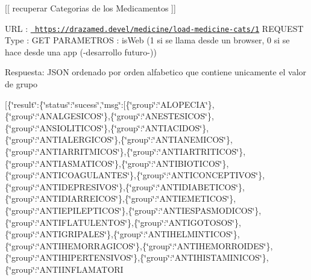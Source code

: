 \mbox{[}\mbox{[} recuperar Categorias de los Medicamentos \mbox{]}\mbox{]}

U\+RL \+: \href{https://drazamed.devel/medicine/load-medicine-cats/1}{\texttt{ https\+://drazamed.\+devel/medicine/load-\/medicine-\/cats/1}} R\+E\+Q\+U\+E\+ST Type \+: G\+ET P\+A\+R\+A\+M\+E\+T\+R\+OS \+: is\+Web (1 si se llama desde un browser, 0 si se hace desde una app (-\/desarrollo futuro-\/))

Respuesta\+: J\+S\+ON ordenado por orden alfabetico que contiene unicamente el valor de grupo

\mbox{[}\{\char`\"{}result\char`\"{}\+:\{\char`\"{}status\char`\"{}\+:\char`\"{}sucess\char`\"{},\char`\"{}msg\char`\"{}\+:\mbox{[}\{\char`\"{}group\char`\"{}\+:\char`\"{}\+A\+L\+O\+P\+E\+C\+I\+A\char`\"{}\},\{\char`\"{}group\char`\"{}\+:\char`\"{}\+A\+N\+A\+L\+G\+E\+S\+I\+C\+O\+S\char`\"{}\},\{\char`\"{}group\char`\"{}\+:\char`\"{}\+A\+N\+E\+S\+T\+E\+S\+I\+C\+O\+S\char`\"{}\},\{\char`\"{}group\char`\"{}\+:\char`\"{}\+A\+N\+S\+I\+O\+L\+I\+T\+I\+C\+O\+S\char`\"{}\},\{\char`\"{}group\char`\"{}\+:\char`\"{}\+A\+N\+T\+I\+A\+C\+I\+D\+O\+S\char`\"{}\},\{\char`\"{}group\char`\"{}\+:\char`\"{}\+A\+N\+T\+I\+A\+L\+E\+R\+G\+I\+C\+O\+S\char`\"{}\},\{\char`\"{}group\char`\"{}\+:\char`\"{}\+A\+N\+T\+I\+A\+N\+E\+M\+I\+C\+O\+S\char`\"{}\},\{\char`\"{}group\char`\"{}\+:\char`\"{}\+A\+N\+T\+I\+A\+R\+R\+I\+T\+M\+I\+C\+O\+S\char`\"{}\},\{\char`\"{}group\char`\"{}\+:\char`\"{}\+A\+N\+T\+I\+A\+R\+T\+R\+I\+T\+I\+C\+O\+S\char`\"{}\},\{\char`\"{}group\char`\"{}\+:\char`\"{}\+A\+N\+T\+I\+A\+S\+M\+A\+T\+I\+C\+O\+S\char`\"{}\},\{\char`\"{}group\char`\"{}\+:\char`\"{}\+A\+N\+T\+I\+B\+I\+O\+T\+I\+C\+O\+S\char`\"{}\},\{\char`\"{}group\char`\"{}\+:\char`\"{}\+A\+N\+T\+I\+C\+O\+A\+G\+U\+L\+A\+N\+T\+E\+S\char`\"{}\},\{\char`\"{}group\char`\"{}\+:\char`\"{}\+A\+N\+T\+I\+C\+O\+N\+C\+E\+P\+T\+I\+V\+O\+S\char`\"{}\},\{\char`\"{}group\char`\"{}\+:\char`\"{}\+A\+N\+T\+I\+D\+E\+P\+R\+E\+S\+I\+V\+O\+S\char`\"{}\},\{\char`\"{}group\char`\"{}\+:\char`\"{}\+A\+N\+T\+I\+D\+I\+A\+B\+E\+T\+I\+C\+O\+S\char`\"{}\},\{\char`\"{}group\char`\"{}\+:\char`\"{}\+A\+N\+T\+I\+D\+I\+A\+R\+R\+E\+I\+C\+O\+S\char`\"{}\},\{\char`\"{}group\char`\"{}\+:\char`\"{}\+A\+N\+T\+I\+E\+M\+E\+T\+I\+C\+O\+S\char`\"{}\},\{\char`\"{}group\char`\"{}\+:\char`\"{}\+A\+N\+T\+I\+E\+P\+I\+L\+E\+P\+T\+I\+C\+O\+S\char`\"{}\},\{\char`\"{}group\char`\"{}\+:\char`\"{}\+A\+N\+T\+I\+E\+S\+P\+A\+S\+M\+O\+D\+I\+C\+O\+S\char`\"{}\},\{\char`\"{}group\char`\"{}\+:\char`\"{}\+A\+N\+T\+I\+F\+L\+A\+T\+U\+L\+E\+N\+T\+O\+S\char`\"{}\},\{\char`\"{}group\char`\"{}\+:\char`\"{}\+A\+N\+T\+I\+G\+O\+T\+O\+S\+O\+S\char`\"{}\},\{\char`\"{}group\char`\"{}\+:\char`\"{}\+A\+N\+T\+I\+G\+R\+I\+P\+A\+L\+E\+S\char`\"{}\},\{\char`\"{}group\char`\"{}\+:\char`\"{}\+A\+N\+T\+I\+H\+E\+L\+M\+I\+N\+T\+I\+C\+O\+S\char`\"{}\},\{\char`\"{}group\char`\"{}\+:\char`\"{}\+A\+N\+T\+I\+H\+E\+M\+O\+R\+R\+A\+G\+I\+C\+O\+S\char`\"{}\},\{\char`\"{}group\char`\"{}\+:\char`\"{}\+A\+N\+T\+I\+H\+E\+M\+O\+R\+R\+O\+I\+D\+E\+S\char`\"{}\},\{\char`\"{}group\char`\"{}\+:\char`\"{}\+A\+N\+T\+I\+H\+I\+P\+E\+R\+T\+E\+N\+S\+I\+V\+O\+S\char`\"{}\},\{\char`\"{}group\char`\"{}\+:\char`\"{}\+A\+N\+T\+I\+H\+I\+S\+T\+A\+M\+I\+N\+I\+C\+O\+S\char`\"{}\},\{\char`\"{}group\char`\"{}\+:\char`\"{}\+A\+N\+T\+I\+I\+N\+F\+L\+A\+M\+A\+T\+O\+R\+I\+